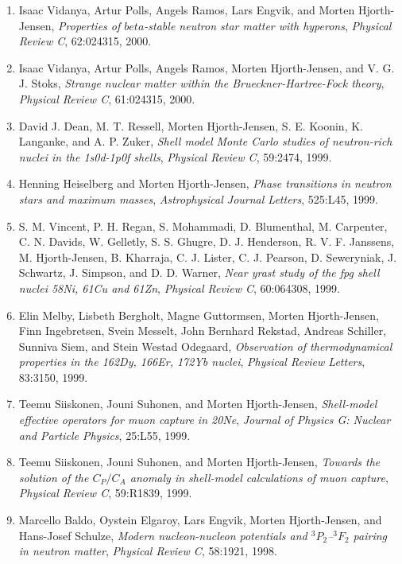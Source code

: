 \documentclass[%
oneside,                 %
final,                   %
10pt]{article}
\begin{document}
\begin{enumerate}
\item Isaac Vidanya, Artur Polls, Angels Ramos, Lars Engvik, and Morten   Hjorth-Jensen, \emph{Properties of $beta$-stable neutron star matter with hyperons},  \emph{Physical Review C}, 62:024315, 2000. 

\item Isaac Vidanya, Artur Polls, Angels Ramos, Morten Hjorth-Jensen, and V. G. J. Stoks, \emph{Strange nuclear matter within the Brueckner-Hartree-Fock   theory},  \emph{Physical Review C}, 61:024315, 2000. 

\item David J. Dean, M. T. Ressell, Morten Hjorth-Jensen, S. E. Koonin, K. Langanke,  and A. P. Zuker, \emph{Shell model Monte Carlo studies of neutron-rich nuclei in the   1s0d-1p0f shells},  \emph{Physical Review C}, 59:2474, 1999. 

\item Henning Heiselberg and Morten Hjorth-Jensen, \emph{Phase transitions in neutron stars and maximum masses},  \emph{Astrophysical Journal Letters}, 525:L45, 1999. 

\item S. M. Vincent, P. H. Regan, S. Mohammadi, D. Blumenthal, M. Carpenter, C. N.   Davids, W. Gelletly, S. S. Ghugre, D. J. Henderson, R. V. F. Janssens,   M. Hjorth-Jensen, B. Kharraja, C. J. Lister, C. J. Pearson, D. Seweryniak,   J. Schwartz, J. Simpson, and D. D. Warner, \emph{Near yrast study of the fpg shell nuclei 58Ni,  61Cu and 61Zn},  \emph{Physical Review C}, 60:064308, 1999. 

\item Elin Melby, Lisbeth Bergholt, Magne Guttormsen, Morten Hjorth-Jensen, Finn   Ingebretsen, Svein Messelt, John Bernhard Rekstad, Andreas Schiller, Sunniva   Siem, and Stein Westad Odegaard, \emph{Observation of thermodynamical properties in the 162Dy,  166Er, 172Yb nuclei},  \emph{Physical Review Letters}, 83:3150, 1999. 

\item Teemu Siiskonen, Jouni Suhonen, and Morten Hjorth-Jensen, \emph{Shell-model effective operators for muon capture in 20Ne},  \emph{Journal of Physics G: Nuclear and Particle Physics}, 25:L55,   1999. 

\item Teemu Siiskonen, Jouni Suhonen, and Morten Hjorth-Jensen, \emph{Towards the solution of the $C_P/C_A$ anomaly in shell-model calculations of muon capture}, \emph{Physical Review C}, 59:R1839, 1999. 

\item Marcello Baldo, Oystein Elgaroy, Lars Engvik, Morten Hjorth-Jensen, and   Hans-Josef Schulze, \emph{Modern nucleon-nucleon potentials and $^3P_2$--$^3F_2$ pairing   in neutron matter},  \emph{Physical Review C}, 58:1921, 1998. 


\end{enumerate}
\end{document}
